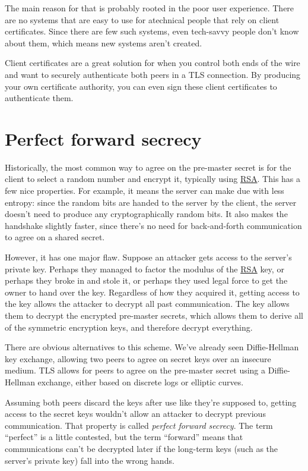 \documentclass[11pt,ebook,table,dvipsnames]{memoir}
\begin{document}
The main reason for that is probably rooted in the poor user
experience. There are no systems that are easy to use for atechnical
people that rely on client certificates. Since there are few such
systems, even tech-savvy people don't know about them, which means
new systems aren't created.

Client certificates are a great solution for when you control both
ends of the wire and want to securely authenticate both peers in a
TLS connection. By producing your own certificate authority, you can
even sign these client certificates to authenticate them.
\section{Perfect forward secrecy}
\label{sec-3-1-6}

Historically, the most common way to agree on the pre-master secret is
for the client to select a random number and encrypt it, typically
using \hyperref[RSA]{RSA}. This has a few nice properties. For example, it means the
server can make due with less entropy: since the random bits are
handed to the server by the client, the server doesn't need to produce
any cryptographically random bits. It also makes the handshake
slightly faster, since there's no need for back-and-forth
communication to agree on a shared secret.

However, it has one major flaw. Suppose an attacker gets access to the
server's private key. Perhaps they managed to factor the modulus of
the \hyperref[RSA]{RSA} key, or perhaps they broke in and stole it, or perhaps they
used legal force to get the owner to hand over the key. Regardless of
how they acquired it, getting access to the key allows the attacker to
decrypt all past communication. The key allows them to decrypt the
encrypted pre-master secrets, which allows them to derive all of the
symmetric encryption keys, and therefore decrypt everything.

There are obvious alternatives to this scheme. We've already seen
Diffie-Hellman key exchange, allowing two peers to agree on secret
keys over an insecure medium. TLS allows for peers to agree on the
pre-master secret using a Diffie-Hellman exchange, either based on
discrete logs or elliptic curves.

Assuming both peers discard the keys after use like they're supposed
to, getting access to the secret keys wouldn't allow an attacker to
decrypt previous communication. That property is called \emph{perfect
forward secrecy}. The term \enquote{perfect} is a little contested, but the
term \enquote{forward} means that communications can't be decrypted later if
the long-term keys (such as the server's private key) fall into the
wrong hands.
\end{document}
